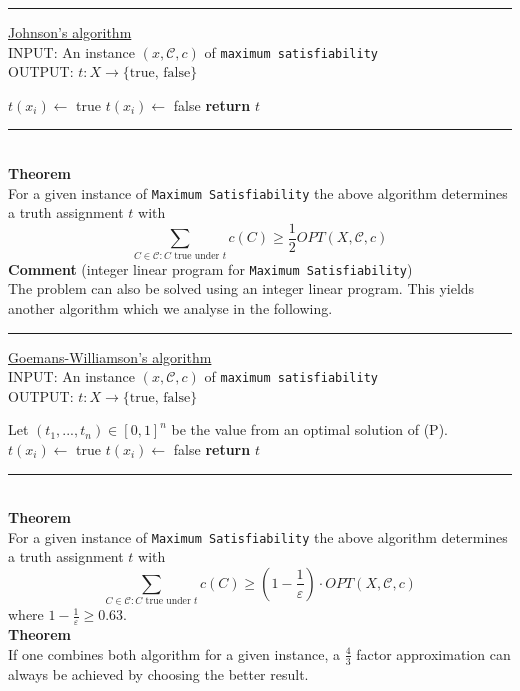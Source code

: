 \documentclass[a4paper, 12pt]{article}
\begin{document}
	\par\noindent\rule{\textwidth}{0.4pt}
	\underline{Johnson's algorithm}\\
	INPUT: An instance $(x,\mathcal{C}, c)$ of \texttt{maximum satisfiability}\\
	OUTPUT: $t: X \to \{\text{true, false}\}$
	\begin{algorithmic}[1]
		\State $t(x_i) \gets$ true
		\Else
		\State $t(x_i) \gets$ false
		\EndIf
		\EndFor
		\State \textbf{return} $t$
	\end{algorithmic}
	\par\noindent\rule{\textwidth}{0.4pt}\\
	\textbf{Theorem}\\
	For a given instance of \texttt{Maximum Satisfiability} the above algorithm determines a truth assignment $t$ with \[\sum_{C \in \mathcal{C}: C \text{ true under } t} c(C) \geq \frac{1}{2} OPT(X,\mathcal{C},c)\]
	\textbf{Comment} (integer linear program for \texttt{Maximum Satisfiability})\\
	The problem can also be solved using an integer linear program. This yields another algorithm which we analyse in the following. 
	\par\noindent\rule{\textwidth}{0.4pt}
	\underline{Goemans-Williamson's algorithm}\\
	INPUT: An instance $(x,\mathcal{C}, c)$ of \texttt{maximum satisfiability}\\
	OUTPUT: $t: X \to \{\text{true, false}\}$
	\begin{algorithmic}[1]
		\State Let $(t_1,...,t_n) \in [0,1]^n$ be the value from an optimal solution of (P).
		\State $t(x_i) \gets$ true
		\Else
		\State $t(x_i) \gets$ false
		\EndIf
		\EndFor
		\State \textbf{return} $t$
	\end{algorithmic}
	\par\noindent\rule{\textwidth}{0.4pt}\\
	\textbf{Theorem}\\
	For a given instance of \texttt{Maximum Satisfiability} the above algorithm determines a truth assignment $t$ with \[\sum_{C \in \mathcal{C}: C \text{ true under } t} c(C) \geq \left(1-\frac{1}{\varepsilon}\right)\cdot OPT(X,\mathcal{C},c)\]
	where $1-\frac{1}{\varepsilon} \geq 0.63$.\\
	\textbf{Theorem}\\
	If one combines both algorithm for a given instance, a $\frac{4}{3}$ factor approximation can always be achieved by choosing the better result.
\end{document}

